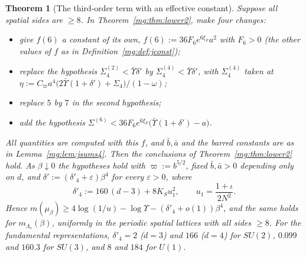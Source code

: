 \documentclass[11pt,a4paper]{article}
\newtheorem{theorem}{Theorem}[section]
\theoremstyle{definition}
\theoremstyle{remark}
\begin{document}
\begin{theorem}[The third-order term with an effective constant]\label{mg:thm:lower4}
Suppose all spatial sides are $\ge8$. In Theorem~\ref{mg:thm:lower2}, make four changes:
\begin{itemize}
\item give $f(6)$ a constant of its own, $f(6):=36F_6e^{6\xi_F}a^2$ with $F_6>0$ (the other values of $f$ as in Definition~\ref{mg:def:jconst});
\item replace the hypothesis $\Sigma^{(2)}_4<\bar\Upsilon\delta'$ by $\Sigma^{(4)}_4<\bar\Upsilon\delta'$, with $\Sigma^{(4)}_4$ taken at $\eta:=C_\varpi a^4\bigl(2\bar\Upsilon(1+\delta')+\Sigma_4\bigr)/(1-\omega)$;
\item replace $5$ by $7$ in the second hypothesis;
\item add the hypothesis $\Sigma^{(6)}<36F_6e^{6\xi_F}\bigl(\bar\Upsilon(1+\delta')-a\bigr)$.
\end{itemize}
All quantities are computed with this $f$, and $\bar b,\bar a$ and the barred constants are as in Lemma~\ref{mg:lem:jsums4}. Then the conclusions of
Theorem~\ref{mg:thm:lower2} hold. As $\beta\downarrow0$ the hypotheses hold with $\varpi:=b^{5/2}$, fixed $\bar b,\bar a>0$ depending only on $d$, and
$\delta':=(\delta'_4+\varepsilon)\beta^4$ for every $\varepsilon>0$, where
\[
\delta'_4:=160\,(d-3)+8K_Su_1^2,\qquad u_1=\frac{1+\iota}{2N^2}.
\]
Hence $m(\mu_\beta)\ge4\log(1/u)-\log\Upsilon-(\delta'_4+o(1))\beta^4$, and the same holds for $m_{\Lambda_s}(\beta)$, uniformly in the periodic spatial lattices with
all sides $\ge8$. For the fundamental representations, $\delta'_4=2$ ($d=3$) and $166$ ($d=4$) for $SU(2)$, $0.099$ and $160.3$ for $SU(3)$, and $8$ and $184$ for
$U(1)$.
\end{theorem}
\end{document}
